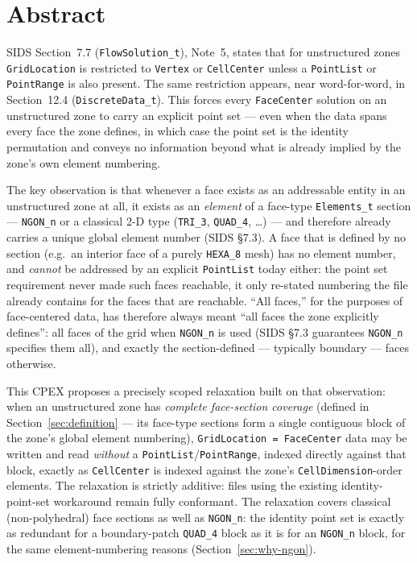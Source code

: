 \documentclass[11pt,letterpaper]{article}
\begin{document}
\vspace{1.5em}

\tableofcontents
\newpage

\section{Abstract}

SIDS Section~7.7 (\texttt{FlowSolution\_t}), Note~5, states that for
unstructured zones \texttt{GridLocation} is restricted to \texttt{Vertex}
or \texttt{CellCenter} unless a \texttt{PointList} or \texttt{PointRange}
is also present. The same restriction appears, near word-for-word, in
Section~12.4 (\texttt{DiscreteData\_t}). This forces every \texttt{FaceCenter}
solution on an unstructured zone to carry an explicit point set --- even
when the data spans every face the zone defines, in which case the
point set is the identity permutation and conveys no information beyond
what is already implied by the zone's own element numbering.

The key observation is that whenever a face exists as an addressable
entity in an unstructured zone at all, it exists as an \emph{element} of a
face-type \texttt{Elements\_t} section --- \texttt{NGON\_n} or a classical
2-D type (\texttt{TRI\_3}, \texttt{QUAD\_4}, \ldots) --- and therefore
already carries a unique global element number (SIDS \S7.3). A face that
is defined by no section (e.g.\ an interior face of a purely
\texttt{HEXA\_8} mesh) has no element number, and \emph{cannot} be
addressed by an explicit \texttt{PointList} today either: the point set
requirement never made such faces reachable, it only re-stated numbering
the file already contains for the faces that are reachable. ``All
faces,'' for the purposes of face-centered data, has therefore always
meant ``all faces the zone explicitly defines'': all faces of the grid
when \texttt{NGON\_n} is used (SIDS \S7.3 guarantees \texttt{NGON\_n}
specifies them all), and exactly the section-defined --- typically
boundary --- faces otherwise.

This CPEX proposes a precisely scoped relaxation built on that
observation: when an unstructured zone has \emph{complete face-section
coverage} (defined in Section~\ref{sec:definition} --- its face-type
sections form a single contiguous block of the zone's global element
numbering), \texttt{GridLocation~=~FaceCenter} data may be written and
read \emph{without} a \texttt{PointList}/\texttt{PointRange}, indexed
directly against that block, exactly as \texttt{CellCenter} is indexed
against the zone's \texttt{CellDimension}-order elements. The relaxation
is strictly additive: files using the existing identity-point-set
workaround remain fully conformant. The relaxation covers classical
(non-polyhedral) face sections as well as \texttt{NGON\_n}: the identity
point set is exactly as redundant for a boundary-patch \texttt{QUAD\_4}
block as it is for an \texttt{NGON\_n} block, for the same
element-numbering reasons (Section~\ref{sec:why-ngon}).
\end{document}

